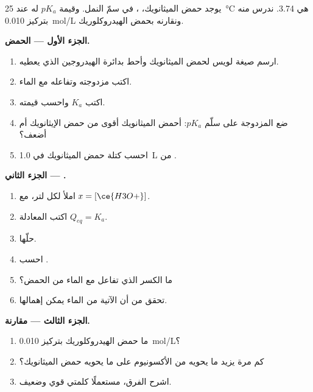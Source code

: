 \begin{problem}
\label{pb:g12:ka-and-pka:1}
يوجد حمض الميثانويك، ، في سمّ النمل. وقيمة $pK_a$ له عند
\qty{25}{\celsius} هي 3.74. ندرس  منه بتركيز \qty{0.010}{mol/L}
ونقارنه بحمض الهيدروكلوريك.

\medskip
\noindent\textbf{الجزء الأول --- الحمض.}
\begin{enumerate}
  \item ارسم صيغة لويس لحمض الميثانويك وأحط بدائرة
        الهيدروجين الذي يعطيه.
  \item اكتب مزدوجته وتفاعله مع الماء.
  \item اكتب $K_a$ واحسب قيمته.
  \item ضع المزدوجة على سلّم $pK_a$: أحمض الميثانويك أقوى
        من حمض الإيثانويك أم أضعف؟
  \item احسب كتلة حمض الميثانويك في \qty{1.0}{L} من
        .
\end{enumerate}

\medskip
\noindent\textbf{الجزء الثاني --- .}
\begin{enumerate}[resume]
  \item املأ  لكل لتر، مع $x = [\ce{H3O+}]$.
  \item اكتب المعادلة $Q_{eq} = K_a$.
  \item حلّها.
  \item احسب .
  \item ما الكسر الذي تفاعل مع الماء من الحمض؟
  \item تحقق من أن  الآتية من الماء يمكن إهمالها.
\end{enumerate}

\medskip
\noindent\textbf{الجزء الثالث --- مقارنة.}
\begin{enumerate}[resume]
  \item ما  حمض الهيدروكلوريك بتركيز \qty{0.010}{mol/L}؟
  \item كم مرة يزيد ما يحويه من  الأكسونيوم على ما يحويه
         حمض الميثانويك؟
  \item اشرح الفرق، مستعملًا كلمتي قوي وضعيف.
\end{enumerate}


\end{problem}
